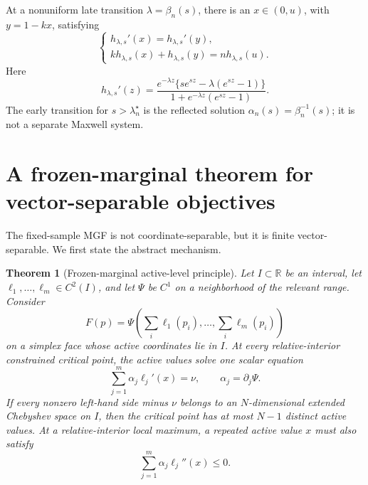 \documentclass[11pt]{article}
\theoremstyle{plain}
\newtheorem{theorem}{Theorem}[section]
\theoremstyle{definition}
\theoremstyle{remark}
\newcommand{\R}{\mathbb R}
\begin{document}
At a nonuniform late transition \(\lambda=\beta_n(s)\), there is an \(x\in(0,u)\), with \(y=1-kx\), satisfying
\begin{equation}\label{eq:transition-system-new}
\begin{cases}
 h_{\lambda,s}'(x)=h_{\lambda,s}'(y),\\
 kh_{\lambda,s}(x)+h_{\lambda,s}(y)=nh_{\lambda,s}(u).
\end{cases}
\end{equation}
Here
\begin{equation}\label{eq:hprime-new}
h_{\lambda,s}'(z)
=\frac{e^{-\lambda z}\{s e^{sz}-\lambda(e^{sz}-1)\}}
{1+e^{-\lambda z}(e^{sz}-1)}.
\end{equation}
The early transition for \(s>\lambda_n^\star\) is the reflected solution \(\alpha_n(s)=\beta_n^{-1}(s)\); it is not a separate Maxwell system.

\section{A frozen-marginal theorem for vector-separable objectives}

The fixed-sample MGF is not coordinate-separable, but it is finite vector-separable.  We first state the abstract mechanism.

\begin{theorem}[Frozen-marginal active-level principle]\label{thm:frozen-abstract}
Let \(I\subset\R\) be an interval, let \(\ell_1,\ldots,\ell_m\in C^2(I)\), and let \(\Psi\) be \(C^1\) on a neighborhood of the relevant range.  Consider
\[
F(p)=\Psi\left(\sum_i\ell_1(p_i),\ldots,\sum_i\ell_m(p_i)\right)
\]
on a simplex face whose active coordinates lie in \(I\).  At every relative-interior constrained critical point, the active values solve one scalar equation
\begin{equation}\label{eq:frozen-abstract-equation}
\sum_{j=1}^m\alpha_j\ell_j'(x)=\nu,
\qquad
\alpha_j=\partial_j\Psi.
\end{equation}
If every nonzero left-hand side minus \(\nu\) belongs to an \(N\)-dimensional extended Chebyshev space on \(I\), then the critical point has at most \(N-1\) distinct active values.  At a relative-interior local maximum, a repeated active value \(x\) must also satisfy
\begin{equation}\label{eq:frozen-concavity}
\sum_{j=1}^m\alpha_j\ell_j''(x)\le0.
\end{equation}
\end{theorem}
\end{document}
